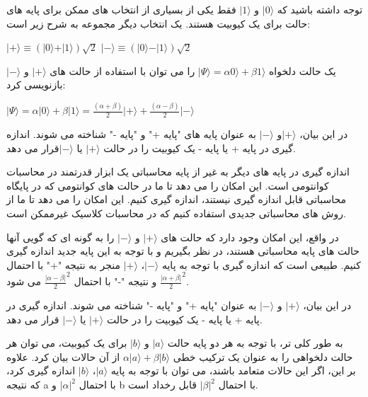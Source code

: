 \documentclass{book}
\begin{document}
توجه داشته باشید که $\vert 0 \rangle$ و $\vert 1 \rangle$ فقط یکی از بسیاری از انتخاب های ممکن برای پایه های حالت برای یک کیوبیت هستند. یک انتخاب دیگر مجموعه به شرح زیر است:
\begin{center}
$\vert+\rangle  \equiv (\vert0\rangle + \vert1\rangle)\sqrt{2}$
$\vert-\rangle \equiv  (\vert0\rangle - \vert1\rangle)\sqrt{2}$
\end{center}
 
 
 یک حالت دلخواه $\vert\Psi\rangle = \alpha0\rangle + \beta1\rangle$ را می توان با استفاده از حالت های $\vert + \rangle$ و $\vert - \rangle$ بازنویسی کرد:
\begin{center}
	$\vert\Psi\rangle = \alpha \vert0\rangle + \beta\vert1\rangle = \frac{(\alpha + \beta)}{2}\vert+\rangle + \frac{(\alpha - \beta)}{2}\vert-\rangle$
\end{center}


در این بیان، $\vert+\rangle$و $\vert-\rangle$ به عنوان پایه های "پایه +" و "پایه -" شناخته می شوند. اندازه گیری در پایه + یا پایه - یک کیوبیت را در حالت $\vert+\rangle$ یا $\vert-\rangle$قرار می دهد.
 

اندازه گیری در پایه های دیگر به غیر از پایه محاسباتی یک ابزار قدرتمند در محاسبات کوانتومی است. این امکان را می دهد تا ما در حالت های کوانتومی که در پایگاه محاسباتی قابل اندازه گیری نیستند، اندازه گیری کنیم. این امکان را می دهد تا ما از روش های محاسباتی جدیدی استفاده کنیم که در محاسبات کلاسیک غیرممکن است.

در واقع، این امکان وجود دارد که حالت های $\vert+\rangle$ و $\vert-\rangle$ را به گونه ای که گویی آنها حالت های پایه محاسباتی هستند، در نظر بگیریم و با توجه به این پایه جدید اندازه گیری کنیم. طبیعی است که اندازه گیری با توجه به پایه $\vert-\rangle$، $\vert+\rangle$ منجر به نتیجه "+" با احتمال $\frac{\vert\alpha + \beta\vert}{2}^2$ و نتیجه "-" با احتمال $\frac{\vert\alpha - \beta\vert}{2}^2$ می شود.


در این بیان، $\vert+\rangle$ و $\vert-\rangle$ به عنوان "پایه +" و "پایه -" شناخته می شوند. اندازه گیری در پایه + یا پایه - یک کیوبیت را در حالت $\vert+\rangle$ یا $\vert-\rangle$ قرار می دهد.

به طور کلی تر، با توجه به هر دو پایه حالت $\vert a\rangle$ و $\vert b\rangle$ برای یک کیوبیت، می توان هر حالت دلخواهی را به عنوان یک ترکیب خطی $\alpha \vert a\rangle + \beta \vert b\rangle$ از آن حالات بیان کرد. علاوه بر این، اگر این حالات  متعامد باشند، می توان با توجه به پایه $\vert a\rangle$، $\vert b\rangle$ اندازه گیری کرد، که نتیجه a با احتمال $\vert\alpha\vert ^2$ و b با احتمال $\vert\beta\vert ^2$ قابل رخداد است.
\end{document}
